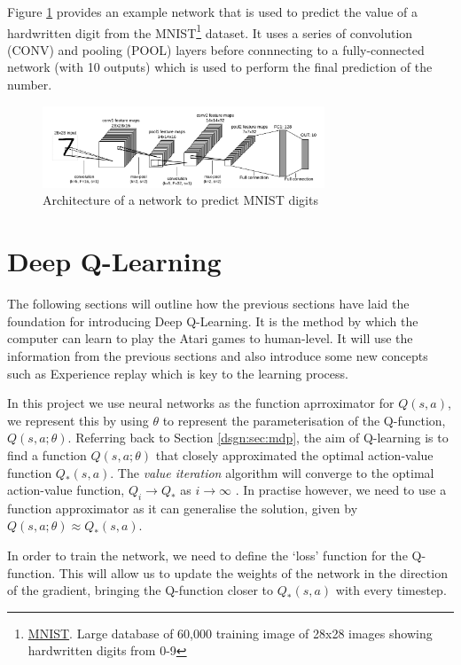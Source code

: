 Figure \ref{fig:mnist-arch} provides an example network that is used to predict the value of a hardwritten digit from the MNIST\footnote{\href{http://yann.lecun.com/exdb/mnist/}{MNIST}. Large database of 60,000 training image of 28x28 images showing hardwritten digits from 0-9} dataset. It uses a series of convolution (CONV) and pooling (POOL) layers before connnecting to a fully-connected network (with 10 outputs) which is used to perform the final prediction of the number.

\begin{figure}[htbp]
	\centering
	\includegraphics[width=0.75\textwidth]{chapters/chapter3/images/mnist.png}
	\caption{Architecture of a network to predict MNIST digits
		\label{fig:mnist-arch}
	}
\end{figure}

\section{Deep Q-Learning}
\label{dsgn:sec:dql}
The following sections will outline how the previous sections have laid the foundation for introducing Deep Q-Learning. It is the method by which the computer can learn to play the Atari games to human-level. It will use the information from the previous sections and also introduce some new concepts such as Experience replay which is key to the learning process.

In this project we use neural networks as the function aprroximator for $Q(s, a)$, we represent this by using $\theta$ to represent the parameterisation of the Q-function, $Q(s, a; \theta)$. Referring back to Section \ref{dsgn:sec:mdp}, the aim of Q-learning is to find a function $Q(s, a; \theta)$ that closely approximated the optimal action-value function $Q_*(s, a)$.
The \textit{value iteration} algorithm will converge to the optimal action-value function, $Q_i \rightarrow Q_*$ as $i \rightarrow \infty$ \cite{richardsutton2018}. In practise however, we need to use a function approximator as it can generalise the solution, given by $Q(s, a; \theta) \approx Q_*(s, a)$.

In order to train the network, we need to define the `loss' function for the Q-function. This will allow us to update the weights of the network in the direction of the gradient, bringing the Q-function closer to $Q_*(s, a)$ with every timestep.

